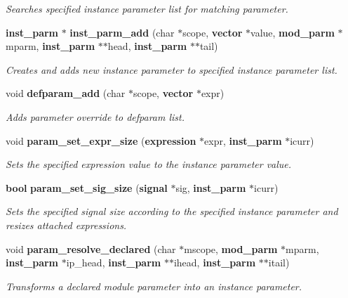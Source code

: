 \begin{CompactItemize}
\begin{CompactList}\small\item\em Searches specified instance parameter list for matching parameter.\item\end{CompactList}\item 
{\bf inst\_\-parm} $\ast$ {\bf inst\_\-parm\_\-add} (char $\ast$scope, {\bf vector} $\ast$value, {\bf mod\_\-parm} $\ast$mparm, {\bf inst\_\-parm} $\ast$$\ast$head, {\bf inst\_\-parm} $\ast$$\ast$tail)
\begin{CompactList}\small\item\em Creates and adds new instance parameter to specified instance parameter list.\item\end{CompactList}\item 
void {\bf defparam\_\-add} (char $\ast$scope, {\bf vector} $\ast$expr)
\begin{CompactList}\small\item\em Adds parameter override to defparam list.\item\end{CompactList}\item 
void {\bf param\_\-set\_\-expr\_\-size} ({\bf expression} $\ast$expr, {\bf inst\_\-parm} $\ast$icurr)
\begin{CompactList}\small\item\em Sets the specified expression value to the instance parameter value.\item\end{CompactList}\item 
{\bf bool} {\bf param\_\-set\_\-sig\_\-size} ({\bf signal} $\ast$sig, {\bf inst\_\-parm} $\ast$icurr)
\begin{CompactList}\small\item\em Sets the specified signal size according to the specified instance parameter and resizes attached expressions.\item\end{CompactList}\item 
void {\bf param\_\-resolve\_\-declared} (char $\ast$mscope, {\bf mod\_\-parm} $\ast$mparm, {\bf inst\_\-parm} $\ast$ip\_\-head, {\bf inst\_\-parm} $\ast$$\ast$ihead, {\bf inst\_\-parm} $\ast$$\ast$itail)
\begin{CompactList}\small\item\em Transforms a declared module parameter into an instance parameter.\item\end{CompactList}\item 

\end{CompactItemize}
